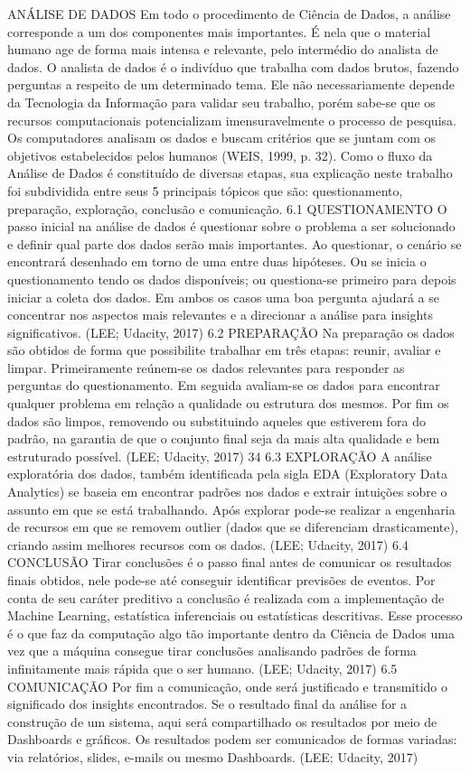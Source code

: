ANÁLISE DE DADOS
Em todo o procedimento de Ciência de Dados, a análise corresponde a um dos componentes mais importantes. É nela que o material humano age de forma mais intensa
e relevante, pelo intermédio do analista de dados. O analista de dados é o indivíduo que trabalha com dados brutos, fazendo perguntas a
respeito de um determinado tema. Ele não necessariamente depende da Tecnologia da
Informação para validar seu trabalho, porém sabe-se que os recursos computacionais
potencializam imensuravelmente o processo de pesquisa. Os computadores analisam os
dados e buscam critérios que se juntam com os objetivos estabelecidos pelos humanos
(WEIS, 1999, p. 32).
Como o fluxo da Análise de Dados é constituído de diversas etapas, sua explicação neste
trabalho foi subdividida entre seus 5 principais tópicos que são: questionamento,
preparação, exploração, conclusão e comunicação.
6.1 QUESTIONAMENTO
O passo inicial na análise de dados é questionar sobre o problema a ser solucionado e
definir qual parte dos dados serão mais importantes. Ao questionar, o cenário se
encontrará desenhado em torno de uma entre duas hipóteses. Ou se inicia o
questionamento tendo os dados disponíveis; ou questiona-se primeiro para depois iniciar
a coleta dos dados. Em ambos os casos uma boa pergunta ajudará a se concentrar nos
aspectos mais relevantes e a direcionar a análise para insights significativos. (LEE;
Udacity, 2017)
6.2 PREPARAÇÃO
Na preparação os dados são obtidos de forma que possibilite trabalhar em três etapas:
reunir, avaliar e limpar. Primeiramente reúnem-se os dados relevantes para responder as
perguntas do questionamento. Em seguida avaliam-se os dados para encontrar qualquer
problema em relação a qualidade ou estrutura dos mesmos. Por fim os dados são limpos,
removendo ou substituindo aqueles que estiverem fora do padrão, na garantia de que o
conjunto final seja da mais alta qualidade e bem estruturado possível. (LEE; Udacity,
2017)
34
6.3 EXPLORAÇÃO
A análise exploratória dos dados, também identificada pela sigla EDA (Exploratory Data
Analytics) se baseia em encontrar padrões nos dados e extrair intuições sobre o assunto
em que se está trabalhando. Após explorar pode-se realizar a engenharia de recursos em
que se removem outlier (dados que se diferenciam drasticamente), criando assim
melhores recursos com os dados. (LEE; Udacity, 2017)
6.4 CONCLUSÃO
Tirar conclusões é o passo final antes de comunicar os resultados finais obtidos, nele
pode-se até conseguir identificar previsões de eventos. Por conta de seu caráter preditivo
a conclusão é realizada com a implementação de Machine Learning, estatística
inferenciais ou estatísticas descritivas. Esse processo é o que faz da computação algo tão
importante dentro da Ciência de Dados uma vez que a máquina consegue tirar
conclusões analisando padrões de forma infinitamente mais rápida que o ser humano.
(LEE; Udacity, 2017)
6.5 COMUNICAÇÃO
Por fim a comunicação, onde será justificado e transmitido o significado dos insights
encontrados. Se o resultado final da análise for a construção de um sistema, aqui será
compartilhado os resultados por meio de Dashboards e gráficos. Os resultados podem ser
comunicados de formas variadas: via relatórios, slides, e-mails ou mesmo Dashboards.
(LEE; Udacity, 2017) 

